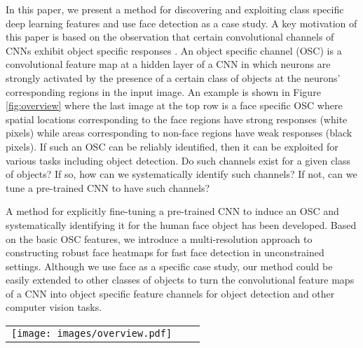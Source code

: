 \documentclass[10pt,twocolumn,letterpaper]{article}
\begin{document}
In this paper, we present a method for discovering and exploiting class specific deep learning features and use face detection as a case study. A key motivation of this paper is based on the observation that certain convolutional channels of CNNs exhibit object specific responses \cite{yosinski2015understanding}. An object specific channel (OSC) is a convolutional feature map at a hidden layer of a CNN in which neurons are strongly activated by the presence of a certain class of objects at the neurons' corresponding regions in the input image. An example is shown in Figure \ref{fig:overview} where the last image at the top row is a face specific OSC where spatial locations corresponding to the face regions have strong responses (white pixels) while areas corresponding to non-face regions have weak responses (black pixels). If such an OSC can be reliably identified, then it can be exploited for various tasks including object detection. Do such channels exist for a given class of objects? If so, how can we systematically identify such channels? If not, can we tune a pre-trained CNN to have such channels?   

A method for explicitly fine-tuning a pre-trained CNN to induce an OSC and systematically identifying it for the human face object has been developed. Based on the basic OSC features, we introduce a multi-resolution approach to constructing robust face heatmaps for fast face detection in unconstrained settings. Although we use face as a specific case study, our method could be easily extended to other classes of objects to turn the convolutional feature maps of a CNN into object specific feature channels for object detection and other computer vision tasks.
 

\begin{figure*}
\begin{tabular}{ccc}
\rule{0pt}{1ex}\hspace{2.24mm}\texttt{[image: images/overview.pdf]}\\[-0.1pt]
\end{tabular}
\caption{(a) An input image is first processed by a CNN, its face specific convolutional channels are identified and a face response heatmap is generated from multi-resolution face specific convolutional channel features. (b) Face proposals are generated based on the heatmap and processed by a binary CNN classifier. Finally detected faces are combined through a Non-Maximum Suppression (NMS) algorithm.}
\label{fig:overview}
\end{figure*}
\end{document}
